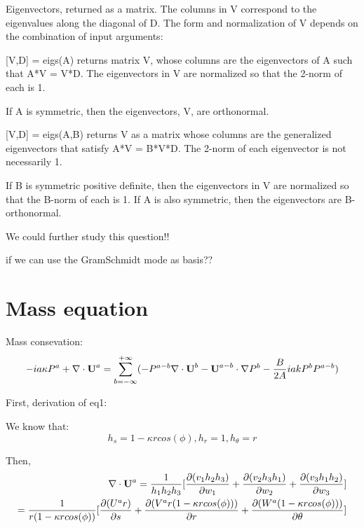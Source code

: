 \documentclass{Note}
\begin{document}
 Eigenvectors, returned as a matrix. The columns in V correspond to the eigenvalues along the diagonal of D. The form and normalization of V depends on the combination of input arguments:

[V,D] = eigs(A) returns matrix V, whose columns are the eigenvectors of A such that A*V = V*D. The eigenvectors in V are normalized so that the 2-norm of each is 1.

If A is symmetric, then the eigenvectors, V, are orthonormal.

[V,D] = eigs(A,B) returns V as a matrix whose columns are the generalized eigenvectors that satisfy A*V = B*V*D. The 2-norm of each eigenvector is not necessarily 1.

If B is symmetric positive definite, then the eigenvectors in V are normalized so that the B-norm of each is 1. If A is also symmetric, then the eigenvectors are B-orthonormal.

We could further study this question!!

if we can use the GramSchmidt mode as basis??

\section{Mass equation}

Mass consevation:
\begin{equation}
-ia\kappa P^a+\nabla\cdot \textbf{U}^a=\sum_{b=-\infty}^{+\infty}(-P^{a-b} \nabla \cdot \textbf{U}^b-\textbf{U}^{a-b}  \cdot \nabla P^b- {B\over {2A}}iakP^bP^{a-b})
\end{equation}

First, derivation of eq1:

We know that:
\begin{equation}
h_s=1-\kappa r cos(\phi),
h_r=1,
h_\theta=r
\end{equation}

Then,
\begin{equation}
\begin{aligned}
\nabla \cdot \textbf{U}^a={1\over{h_1 h_2 h_3}}[{\partial(v_1 h_2 h_3)\over \partial w_1}+{\partial(v_2 h_3 h_1)\over \partial w_2}+{\partial(v_3 h_1 h_2)\over \partial w_3}] \\
={1\over r(1-\kappa r cos(\phi))} [{\partial(U^a r)\over \partial s}+{\partial(V^a r(1-\kappa r cos(\phi)))\over \partial r}+{\partial(W^a (1-\kappa r cos(\phi)))\over \partial \theta}]
\end{aligned}
\end{equation}
\end{document}
